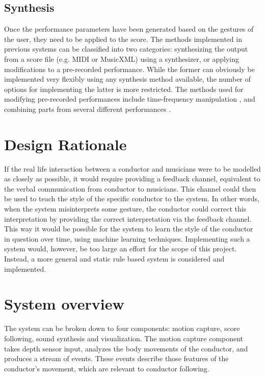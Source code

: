 \subsection{Synthesis}

Once the performance parameters have been generated
based on the gestures of the user,
they need to be applied to the score.
The methods implemented in previous systems can be classified
into two categories:
synthesizing the output from a score file (e.g. MIDI or MusicXML)
using a synthesizer,
or applying modifications to a pre-recorded performance.
While the former can obviously be implemented very flexibly
using any synthesis method available,
the number of options for implementing the latter is more restricted.
The methods used for modifying pre-recorded performances
include time-frequency manipulation \cite{},
and combining parts from several different performances \cite{}.

\section{Design Rationale}

If the real life interaction between a conductor and musicians
were to be modelled as closely as possible,
it would require providing a feedback channel,
equivalent to the verbal communication from conductor to musicians.
This channel could then be used to teach the
style of the specific conductor to the system.
In other words, when the system misinterprets some gesture,
the conductor could correct this interpretation by 
providing the correct interpretation via the feedback channel.
This way it would be possible for the system to
learn the style of the conductor in question over time,
using machine learning techniques.
Implementing such a system would, however,
be too large an effort for the scope of this project.
Instead, a more general and static rule based system is
considered and implemented.


\section{System overview}

The system can be broken down to four components:
motion capture, score following, sound synthesis
and visualization.
The motion capture component
takes depth sensor input,
analyzes the body movements of the conductor,
and produces a stream of events.
These events describe those features of the conductor's movement,
which are relevant to conductor following.

